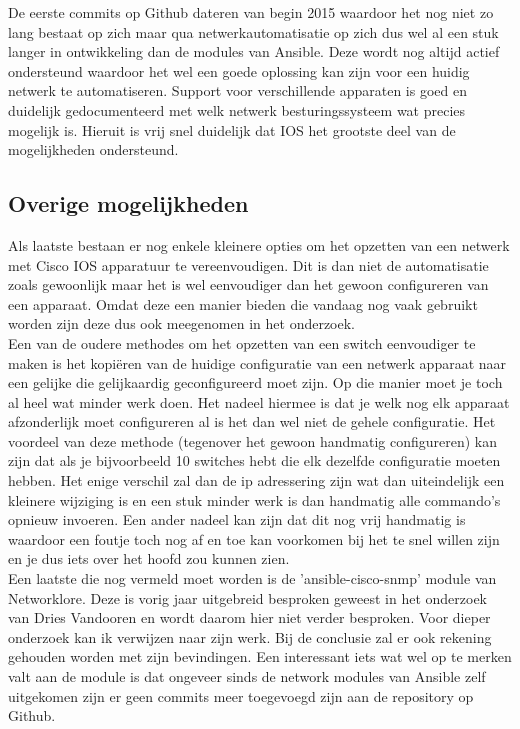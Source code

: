De eerste commits op Github dateren van begin 2015 waardoor het nog niet zo lang bestaat op zich maar qua netwerkautomatisatie op zich dus wel al een stuk langer in ontwikkeling dan de modules van Ansible. Deze wordt nog altijd actief ondersteund waardoor het wel een goede oplossing kan zijn voor een huidig netwerk te automatiseren. Support voor verschillende apparaten is goed en duidelijk gedocumenteerd met welk netwerk besturingssysteem wat precies mogelijk is. Hieruit is vrij snel duidelijk dat IOS het grootste deel van de mogelijkheden ondersteund.\autocite{napalmSupport}

\subsection{Overige mogelijkheden}
\label{sec:overige}
Als laatste bestaan er nog enkele kleinere opties om het opzetten van een netwerk met Cisco IOS apparatuur te vereenvoudigen.  Dit is dan niet de automatisatie zoals gewoonlijk maar het is wel eenvoudiger dan het gewoon configureren van een apparaat. Omdat deze een manier bieden die vandaag nog vaak gebruikt worden zijn deze dus ook meegenomen in het onderzoek.
\\

Een van de oudere methodes om het opzetten van een switch eenvoudiger te maken is het kopiëren van de huidige configuratie van een netwerk apparaat naar een gelijke die gelijkaardig geconfigureerd moet zijn. Op die manier moet je toch al heel wat minder werk doen. Het nadeel hiermee is dat je welk nog elk apparaat afzonderlijk moet configureren al is het dan wel niet de gehele configuratie. Het voordeel van deze methode (tegenover het gewoon handmatig configureren) kan zijn dat als je bijvoorbeeld 10 switches hebt die elk dezelfde configuratie moeten hebben. Het enige verschil zal dan de ip adressering zijn wat dan uiteindelijk een kleinere wijziging is en een stuk minder werk is dan handmatig alle commando's opnieuw invoeren. Een ander nadeel kan zijn dat dit nog vrij handmatig is waardoor een foutje toch nog af en toe kan voorkomen bij het te snel willen zijn en je dus iets over het hoofd zou kunnen zien.
\\

Een laatste die nog vermeld moet worden is de 'ansible-cisco-snmp' module van Networklore. Deze is vorig jaar uitgebreid besproken geweest in het onderzoek van Dries Vandooren en wordt daarom hier niet verder besproken. Voor dieper onderzoek kan ik verwijzen naar zijn werk. Bij de conclusie zal er ook rekening gehouden worden met zijn bevindingen. Een interessant iets wat wel op te merken valt aan de module is dat ongeveer sinds de network modules van Ansible zelf uitgekomen zijn er geen commits meer toegevoegd zijn aan de repository op Github.\autocite{Vandooren2015}


